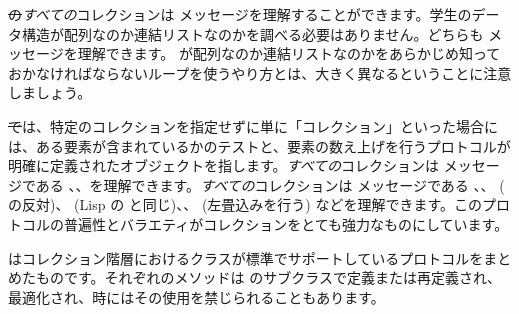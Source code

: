 \documentclass[a4paper,10pt,twoside]{book}
\begin{document}
\st の\emph{すべての}コレクションは メッセージを理解することができます。学生のデータ構造が配列なのか連結リストなのかを調べる必要はありません。どちらも  メッセージを理解できます。  が配列なのか連結リストなのかをあらかじめ知っておかなければならないループを使うやり方とは、大きく異なるということに注意しましょう。

\st では、特定のコレクションを指定せずに単に「コレクション」といった場合には、ある要素が含まれているかのテストと、要素の数え上げを行うプロトコルが明確に定義されたオブジェクトを指します。\emph{すべての}コレクションは  メッセージである \mbox{、}\mbox{、}を理解できます。\emph{すべての}コレクションは  メッセージである 、、 ( の反対)、 (Lisp の と同じ)、、 (左畳込みを行う) などを理解できます。このプロトコルの普遍性とバラエティがコレクションをとても強力なものにしています。

 はコレクション階層におけるクラスが標準でサポートしているプロトコルをまとめたものです。それぞれのメソッドは  のサブクラスで定義または再定義され、最適化され、時にはその使用を禁じられることもあります。
\end{document}
